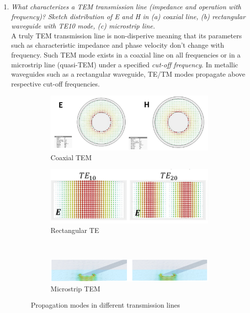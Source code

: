 \documentclass[11pt,a4paper]{article}
\begin{document}
\begin{enumerate}
    \item \emph{What characterizes a TEM transmission line (impedance and operation with frequency)? Sketch distribution of E and H in (a) coaxial line, (b) rectangular waveguide with TE10 mode, (c) microstrip line.}\\
    A truly TEM transmission line is non-disperive meaning that its parameters such as characteristic impedance and phase velocity don't change with frequency. Such TEM mode exists in a coaxial line on all frequencies or in a microstrip line (quasi-TEM) under a specified \emph{cut-off frequency}. In metallic waveguides such as a rectangular waveguide, TE/TM modes propagate above respective cut-off frequencies.
    \begin{figure}[!ht]
        \centering
    \begin{subfigure}{0.45\textwidth}
        \centering
        \includegraphics[width=\textwidth]{src/tem-coax.png}
        \caption{Coaxial TEM}
    \end{subfigure}
    \begin{subfigure}{0.45\textwidth}
        \centering
        \includegraphics[width=\textwidth]{src/te-rectangular.png}
        \caption{Rectangular TE}
    \end{subfigure}\\
    \begin{subfigure}{0.9\textwidth}
        \centering
        \includegraphics[width=\textwidth]{src/tem-microstrip.png}
        \caption{Microstrip TEM}
    \end{subfigure}
    \caption{\label{fig:propagation-modes}Propagation modes in different transmission lines}
    \end{figure}


\end{enumerate}
\end{document}
